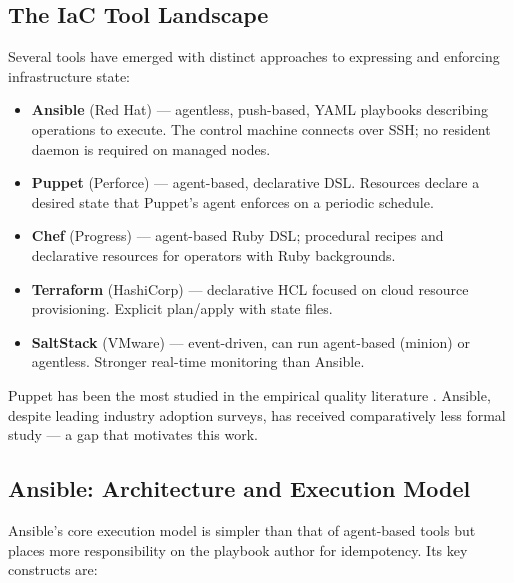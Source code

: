 \subsection{The IaC Tool Landscape}

Several tools have emerged with distinct approaches to expressing and enforcing
infrastructure state:

\begin{itemize}
  \item \textbf{Ansible} (Red Hat) — agentless, push-based, YAML playbooks
        describing operations to execute. The control machine connects over
        \ac{SSH}; no resident daemon is required on managed nodes.
  \item \textbf{Puppet} (Perforce) — agent-based, declarative \ac{DSL}. Resources
        declare a desired state that Puppet's agent enforces on a periodic schedule.
  \item \textbf{Chef} (Progress) — agent-based Ruby \ac{DSL}; procedural recipes
        and declarative resources for operators with Ruby backgrounds.
  \item \textbf{Terraform} (HashiCorp) — declarative HCL focused on cloud resource
        provisioning. Explicit plan/apply with state files.
  \item \textbf{SaltStack} (VMware) — event-driven, can run agent-based (minion)
        or agentless. Stronger real-time monitoring than Ansible.
\end{itemize}

\noindent
Puppet has been the most studied in the empirical quality literature
\cite{sharma2016puppet,bessghaier2024saner}. Ansible, despite leading industry
adoption surveys, has received comparatively less formal study — a gap that
motivates this work.

\subsection{Ansible: Architecture and Execution Model}
\label{sec:ansible_arch}

Ansible's core execution model is simpler than that of agent-based tools but
places more responsibility on the playbook author for idempotency. Its key
constructs are:

